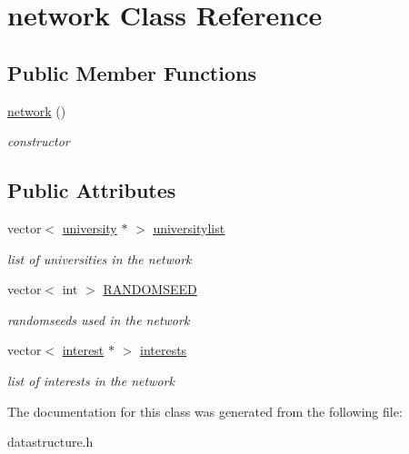 \hypertarget{classnetwork}{\section{network \-Class \-Reference}
\label{classnetwork}
}
\subsection*{\-Public \-Member \-Functions}
\begin{DoxyCompactItemize}
\item 
\hypertarget{classnetwork_a34d93274889f9058f789b2aed201d3d5}{\hyperlink{classnetwork_a34d93274889f9058f789b2aed201d3d5}{network} ()}\label{classnetwork_a34d93274889f9058f789b2aed201d3d5}

\begin{DoxyCompactList}\small\item\em constructor \end{DoxyCompactList}\end{DoxyCompactItemize}
\subsection*{\-Public \-Attributes}
\begin{DoxyCompactItemize}
\item 
\hypertarget{classnetwork_ac8a2e7f63a75b257a7af037fe3ab5193}{vector$<$ \hyperlink{classuniversity}{university} $\ast$ $>$ \hyperlink{classnetwork_ac8a2e7f63a75b257a7af037fe3ab5193}{universitylist}}\label{classnetwork_ac8a2e7f63a75b257a7af037fe3ab5193}

\begin{DoxyCompactList}\small\item\em list of universities in the network \end{DoxyCompactList}\item 
\hypertarget{classnetwork_a83ca10bc2bc9a2ca8f94ee4758dae9a9}{vector$<$ int $>$ \hyperlink{classnetwork_a83ca10bc2bc9a2ca8f94ee4758dae9a9}{\-R\-A\-N\-D\-O\-M\-S\-E\-E\-D}}\label{classnetwork_a83ca10bc2bc9a2ca8f94ee4758dae9a9}

\begin{DoxyCompactList}\small\item\em randomseeds used in the network \end{DoxyCompactList}\item 
\hypertarget{classnetwork_a95b687b96ac0576f8df32e6e97783012}{vector$<$ \hyperlink{classinterest}{interest} $\ast$ $>$ \hyperlink{classnetwork_a95b687b96ac0576f8df32e6e97783012}{interests}}\label{classnetwork_a95b687b96ac0576f8df32e6e97783012}

\begin{DoxyCompactList}\small\item\em list of interests in the network \end{DoxyCompactList}\end{DoxyCompactItemize}


\-The documentation for this class was generated from the following file\-:\begin{DoxyCompactItemize}
\item 
datastructure.\-h\end{DoxyCompactItemize}
